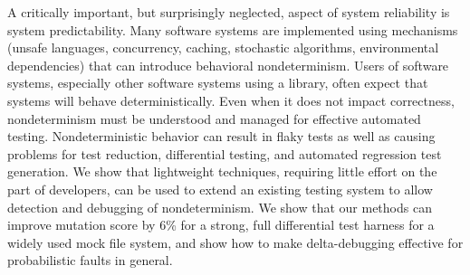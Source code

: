 A critically important, but surprisingly neglected, aspect of system reliability is system predictability.  Many software systems are implemented using mechanisms (unsafe languages, concurrency, caching, stochastic algorithms, environmental dependencies) that can introduce behavioral nondeterminism.  Users of software systems, especially other software systems using a library, often expect that systems will behave deterministically.  Even when it does not impact correctness, nondeterminism must be understood and managed for effective automated testing.  Nondeterministic behavior can result in flaky tests as well as causing problems for test reduction, differential testing, and automated regression test generation.  We show that lightweight techniques, requiring little effort on the part of developers, can be used to extend an existing testing system to allow detection and debugging of nondeterminism.  We show that our methods can improve mutation score by 6\% for a strong, full differential test harness for a widely used mock file system, and show how to make delta-debugging effective for probabilistic faults in general.